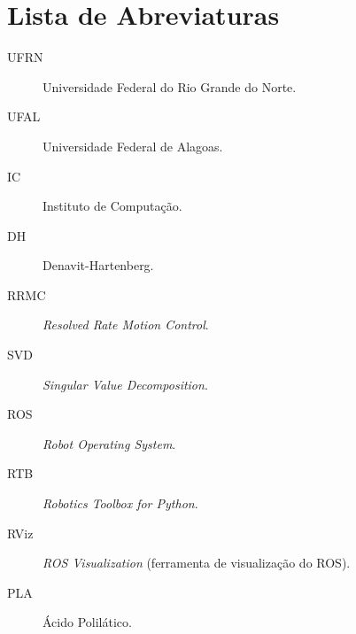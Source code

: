 \chapter*{Lista de Abreviaturas}

\begin{description}
  \item[UFRN] \quad Universidade Federal do Rio Grande do Norte.
  \item[UFAL] \quad Universidade Federal de Alagoas.
  \item[IC] \quad Instituto de Computação.
  \item[DH] \quad Denavit-Hartenberg.
  \item[RRMC] \quad \emph{Resolved Rate Motion Control}.
  \item[SVD] \quad \emph{Singular Value Decomposition}.
  \item[ROS] \quad \emph{Robot Operating System}.
  \item[RTB] \quad \emph{Robotics Toolbox for Python}.
  \item[RViz] \quad \emph{ROS Visualization} (ferramenta de visualização do ROS).
  \item[PLA] \quad Ácido Polilático.
\end{description}